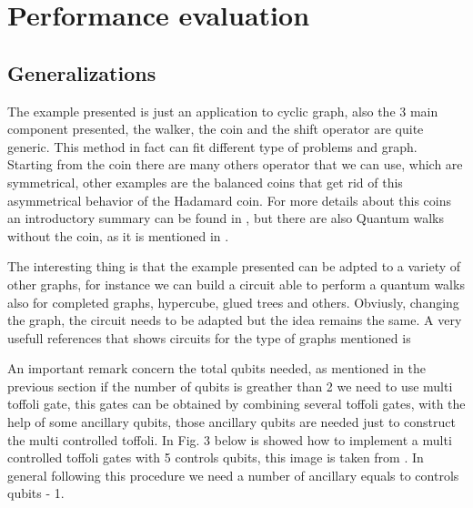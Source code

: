 \section{Performance evaluation}

\subsection{Generalizations}

The example presented is just an application to cyclic graph, also the 3 main component presented, the walker, 
the coin and the shift operator are quite generic. This method in fact can fit different type of problems and graph.
Starting from the coin there are many others operator that we can use, which are symmetrical, other examples are the 
balanced coins that get rid of this asymmetrical behavior of the Hadamard coin. For more details
about this coins an introductory summary can be found in \cite{Kempe_2003}, but there are also Quantum walks without
the coin, as it is mentioned in \cite{6812670}.


The interesting thing is that the example presented can be adpted to a variety of other graphs, for instance we can
build a circuit able to perform a quantum walks also for completed graphs, hypercube, glued trees and others. 
Obviusly, changing the graph, the circuit needs to be adapted but the idea remains the same. A very usefull 
references that shows circuits for the type of graphs mentioned is \cite{douglas2007efficient}


An important remark concern the total qubits needed, as mentioned in the previous section if
the number of qubits is greather than 2 we need to use multi toffoli gate, this gates can be 
obtained by combining several toffoli gates, with the help of some ancillary qubits, those 
ancillary qubits are needed just to construct the multi controlled toffoli. In Fig. 3 below
is showed how to implement a multi controlled toffoli gates with 5 controls qubits, 
this image is taken from \cite{nielsen_chuang_2010}. In general following this procedure
we need a number of ancillary equals to controls qubits - 1.

